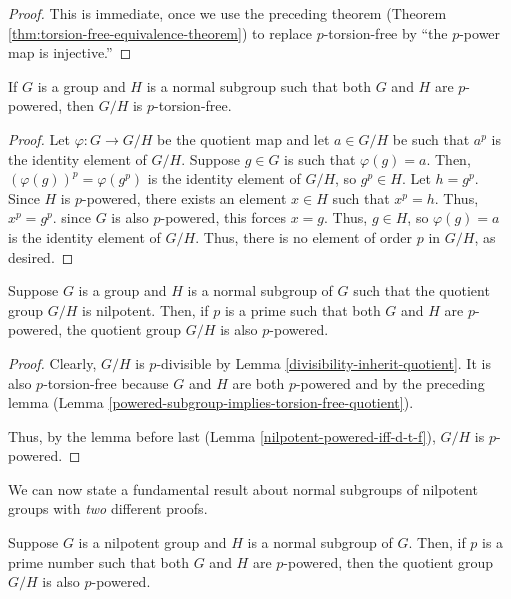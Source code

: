 \documentclass{ucetd}
\begin{document}
\begin{proof}
  This is immediate, once we use the preceding theorem (Theorem
  \ref{thm:torsion-free-equivalence-theorem}) to replace $p$-torsion-free
  by ``the $p$-power map is injective.''
\end{proof}

\begin{lemma}\label{powered-subgroup-implies-torsion-free-quotient}
  If $G$ is a group and $H$ is a normal subgroup such that both $G$
  and $H$ are $p$-powered, then $G/H$ is $p$-torsion-free.
\end{lemma}

\begin{proof}
  Let $\varphi:G \to G/H$ be the quotient map and let $a \in G/H$ be such
  that $a^p$ is the identity element of $G/H$. Suppose $g \in G$ is
  such that $\varphi(g) = a$. Then, $(\varphi(g))^p = \varphi(g^p)$ is the
  identity element of $G/H$, so $g^p \in H$. Let $h = g^p$. Since $H$
  is $p$-powered, there exists an element $x \in H$ such that $x^p =
  h$. Thus, $x^p = g^p$. since $G$ is also $p$-powered, this forces $x
  = g$. Thus, $g \in H$, so $\varphi(g) = a$ is the identity element of
  $G/H$. Thus, there is no element of order $p$ in $G/H$, as desired.
\end{proof}

\begin{theorem}\label{nilpotent-quotient-piequalsqpi}
  Suppose $G$ is a group and $H$ is a normal subgroup of $G$ such that
  the quotient group $G/H$ is nilpotent. Then, if $p$ is a prime such
  that both $G$ and $H$ are $p$-powered, the quotient group $G/H$ is
  also $p$-powered.
\end{theorem}

\begin{proof}
  Clearly, $G/H$ is $p$-divisible by Lemma
  \ref{divisibility-inherit-quotient}. It is also $p$-torsion-free
  because $G$ and $H$ are both $p$-powered and by the preceding lemma
  (Lemma \ref{powered-subgroup-implies-torsion-free-quotient}).

  Thus, by the lemma before last (Lemma
  \ref{nilpotent-powered-iff-d-t-f}), $G/H$ is $p$-powered.
\end{proof}

We can now state a fundamental result about normal subgroups of
nilpotent groups with {\em two} different proofs.

\begin{theorem}\label{normalsubgroupofnilpotentgroup}
  Suppose $G$ is a nilpotent group and $H$ is a normal subgroup of
  $G$. Then, if $p$ is a prime number such that both $G$ and $H$ are
  $p$-powered, then the quotient group $G/H$ is also $p$-powered.
\end{theorem}
\end{document}
